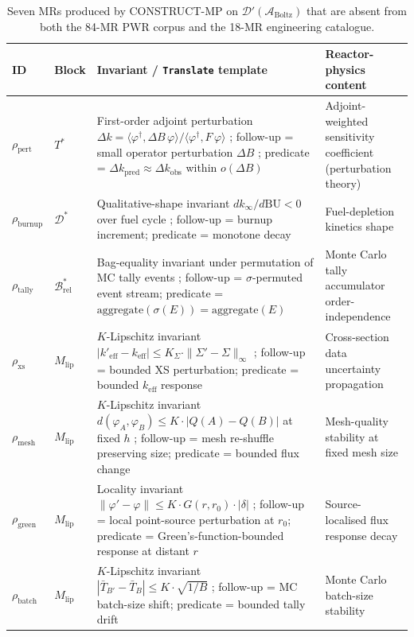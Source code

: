 \begin{table}[h]
\centering
\caption{Seven MRs produced by CONSTRUCT-MP on $\mathcal{D}'(\mathcal{A}_{\mathrm{Boltz}})$ that are absent from both the 84-MR PWR corpus and the 18-MR engineering catalogue.}
\label{tab:pmcm-new7}
\footnotesize
\begin{tabular}{p{2.0cm}p{1.0cm}p{4.5cm}p{4.5cm}}
\toprule
\textbf{ID} & \textbf{Block} & \textbf{Invariant / \texttt{Translate} template} & \textbf{Reactor-physics content} \\
\midrule
$\rho_{\mathrm{pert}}$ & $T^{*}$ & First-order adjoint perturbation $\Delta k = \langle \varphi^{\dagger}, \Delta B \, \varphi \rangle / \langle \varphi^{\dagger}, F\, \varphi \rangle$ ; follow-up = small operator perturbation $\Delta B$ ; predicate = $\Delta k_{\mathrm{pred}} \approx \Delta k_{\mathrm{obs}}$ within $o(\Delta B)$ & Adjoint-weighted sensitivity coefficient (perturbation theory) \\
\addlinespace
$\rho_{\mathrm{burnup}}$ & $\mathcal{D}^{*}$ & Qualitative-shape invariant $dk_{\infty}/d\mathrm{BU} < 0$ over fuel cycle ; follow-up = burnup increment; predicate = monotone decay & Fuel-depletion kinetics shape \\
\addlinespace
$\rho_{\mathrm{tally}}$ & $\mathcal{B}^{*}_{\mathrm{rel}}$ & Bag-equality invariant under permutation of MC tally events ; follow-up = $\sigma$-permuted event stream; predicate = $\mathrm{aggregate}(\sigma(E)) = \mathrm{aggregate}(E)$ & Monte Carlo tally accumulator order-independence \\
\addlinespace
$\rho_{\mathrm{xs}}$ & $M_{\mathrm{lip}}$ & $K$-Lipschitz invariant $|k'_{\mathrm{eff}} - k_{\mathrm{eff}}| \le K_{\Sigma} \cdot \|\Sigma' - \Sigma\|_{\infty}$ ; follow-up = bounded XS perturbation; predicate = bounded $k_{\mathrm{eff}}$ response & Cross-section data uncertainty propagation \\
\addlinespace
$\rho_{\mathrm{mesh}}$ & $M_{\mathrm{lip}}$ & $K$-Lipschitz invariant $d(\varphi_A, \varphi_B) \le K \cdot |Q(A) - Q(B)|$ at fixed $h$ ; follow-up = mesh re-shuffle preserving size; predicate = bounded flux change & Mesh-quality stability at fixed mesh size \\
\addlinespace
$\rho_{\mathrm{green}}$ & $M_{\mathrm{lip}}$ & Locality invariant $\|\varphi' - \varphi\| \le K \cdot G(r, r_0) \cdot |\delta|$ ; follow-up = local point-source perturbation at $r_0$; predicate = Green's-function-bounded response at distant $r$ & Source-localised flux response decay \\
\addlinespace
$\rho_{\mathrm{batch}}$ & $M_{\mathrm{lip}}$ & $K$-Lipschitz invariant $|\bar T_{B'} - \bar T_B| \le K \cdot \sqrt{1/B}$ ; follow-up = MC batch-size shift; predicate = bounded tally drift & Monte Carlo batch-size stability \\
\bottomrule
\end{tabular}
\end{table}

